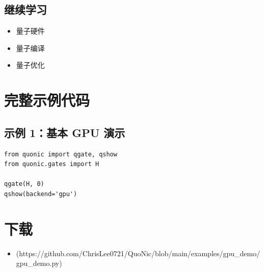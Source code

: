 \documentclass[12pt,a4paper]{article}
\begin{document}
\subsection{继续学习}
\begin{itemize}
  \item 量子硬件
  \item 量子编译
  \item 量子优化
\end{itemize}

\section{完整示例代码}

\subsection{示例 1：基本 GPU 演示}

\begin{verbatim}
from quonic import qgate, qshow
from quonic.gates import H

qgate(H, 0)
qshow(backend='gpu')
\end{verbatim}

\section{下载}

\begin{itemize}
  \item [gpu\_demo.py](https://github.com/ChrisLee0721/QuoNic/blob/main/examples/gpu_demo/gpu_demo.py)
\end{itemize}
\end{document}
